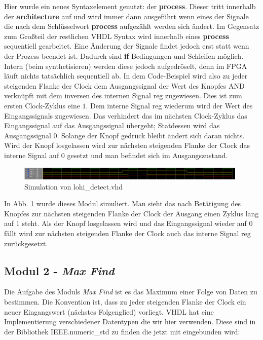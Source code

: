 Hier wurde ein neues Syntaxelement genutzt: der \textbf{process}.
Dieser tritt innerhalb der \textbf{architecture} auf und wird immer dann ausgeführt wenn eines der Signale die nach dem Schlüsselwort \textbf{process} aufgezählt werden sich ändert.
Im Gegensatz zum Großteil der restlichen VHDL Syntax wird innerhalb eines \textbf{process} sequentiell gearbeitet.
Eine Änderung der Signale findet jedoch erst statt wenn der Prozess beendet ist.
Dadurch sind \textbf{if} Bedingungen und Schleifen möglich.
Intern (beim synthetisieren) werden diese jedoch aufgedröselt, denn im FPGA läuft nichts tatsächlich sequentiell ab.
In dem Code-Beispiel wird also zu jeder steigenden Flanke der Clock dem Ausgangssignal der Wert des Knopfes AND verknüpft mit dem inversen des internen Signal reg zugewiesen.
Dies ist zum ersten Clock-Zyklus eine $1$.
Dem interne Signal reg wiederum wird der Wert des Eingangssignals zugewiesen.
Das verhindert das im nächsten Clock-Zyklus das Eingangssignal auf das Ausgangssignal übergeht; Statdessen wird das Ausgangssignal $0$.
Solange der Knopf gedrück bleibt ändert sich daran nichts.
Wird der Knopf losgelassen wird zur nächsten steigenden Flanke der Clock das interne Signal auf $0$ gesetzt und man befindet sich im Ausgangszustand.

\begin{figure}[ht]
	\centering
    \includegraphics[width=0.98\textwidth]{../Daten/lohi_detect.png}
	\caption{Simulation von lohi\_detect.vhd}
	\label{img_lohi_detect}
\end{figure}

In Abb. \ref{img_lohi_detect} wurde dieses Modul simuliert.
Man sieht das nach Betätigung des Knopfes zur nächsten steigenden Flanke der Clock der Ausgang einen Zyklus lang auf $1$ steht.
Als der Knopf losgelassen wird und das Eingangssignal wieder auf $0$ fällt wird zur nächsten steigenden Flanke der Clock auch das interne Signal reg zurückgesetzt.

\subsection{Modul 2 - \textit{Max Find}}

Die Aufgabe des Moduls \textit{Max Find} ist es das Maximum einer Folge von Daten zu bestimmen.
Die Konvention ist, dass zu jeder steigenden Flanke der Clock ein neuer Eingangswert (nächstes Folgenglied) vorliegt.
VHDL hat eine Implementierung verschiedener Datentypen die wir hier verwenden.
Diese sind in der Bibliothek IEEE.numeric\_std zu finden die jetzt mit eingebunden wird:

